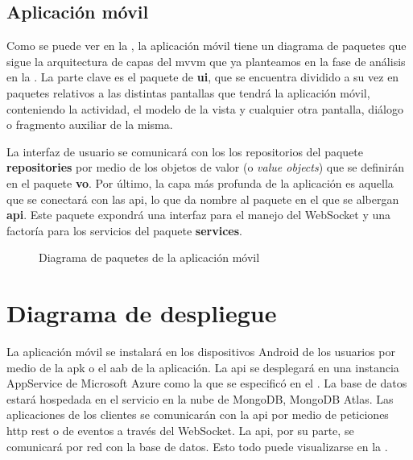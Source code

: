 \subsection{Aplicación móvil}

Como se puede ver en la , la aplicación móvil tiene un diagrama de paquetes que sigue la arquitectura de capas del \acrlong{mvvm} que ya planteamos en la fase de análisis en la . La parte clave es el paquete de \textbf{ui}, que se encuentra dividido a su vez en paquetes relativos a las distintas pantallas que tendrá la aplicación móvil, conteniendo la actividad, el modelo de la vista y cualquier otra pantalla, diálogo o fragmento auxiliar de la misma.

La interfaz de usuario se comunicará con los los repositorios del paquete \textbf{repositories} por medio de los objetos de valor (o \emph{value objects}) que se definirán en el paquete \textbf{vo}. Por último, la capa más profunda de la aplicación es aquella que se conectará con las \acrshort{api}, lo que da nombre al paquete en el que se albergan \textbf{api}. Este paquete expondrá una interfaz para el manejo del WebSocket y una factoría para los servicios del paquete \textbf{services}.

\begin{figure}[H]
    \centering
    \caption{Diagrama de paquetes de la aplicación móvil}
    \label{fig:diagrama_paquetes_app}
\end{figure}

\section{Diagrama de despliegue}

La aplicación móvil se instalará en los dispositivos Android de los usuarios por medio de la \acrshort{apk} o el \acrlong{aab} de la aplicación. La \acrshort{api} se desplegará en una instancia AppService de Microsoft Azure como la que se especificó en el . La base de datos estará hospedada en el servicio en la nube de MongoDB, MongoDB Atlas. Las aplicaciones de los clientes se comunicarán con la \acrshort{api} por medio de peticiones \acrshort{http} \acrshort{rest} o de eventos a través del WebSocket. La \acrshort{api}, por su parte, se comunicará por red con la base de datos. Esto todo puede visualizarse en la .

